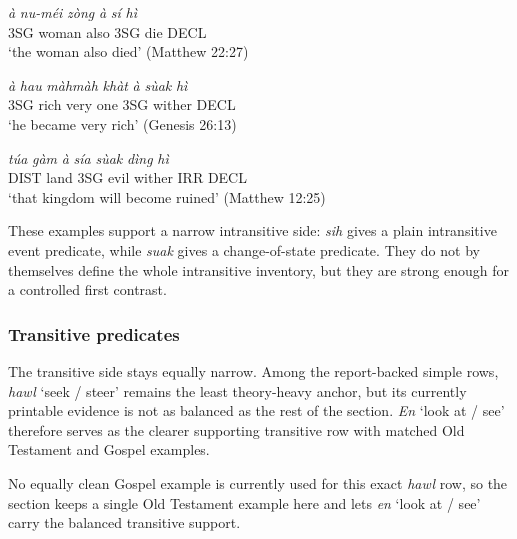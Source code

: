 \documentclass[
  11pt,
  a4paper,
]{article}
\newcommand{\tdim}[1]{\textit{#1}}
\newcommand{\tdimword}[1]{\textit{#1}}
\renewcommand{\textsc}[1]{{\footnotesize\MakeUppercase{#1}}}
\newcommand{\glossquote}[1]{`#1'}
\begin{document}
\begin{exe}
\ex \label{ex:trans-sih-matt22}
\gll \tdimword{à} \tdimword{nu-méi} \tdimword{zòng} \tdimword{à} \tdimword{sí} \tdimword{hì} \\
     \textsc{3sg} woman also \textsc{3sg} die \textsc{decl} \\
\glt \glossquote{the woman also died} (Matthew 22:27)
\end{exe}

\begin{exe}
\ex \label{ex:trans-suak-gen26}
\gll \tdimword{à} \tdimword{hau} \tdimword{màhmàh} \tdimword{khàt} \tdimword{à} \tdimword{sùak} \tdimword{hì} \\
     \textsc{3sg} rich very one \textsc{3sg} wither \textsc{decl} \\
\glt \glossquote{he became very rich} (Genesis 26:13)
\end{exe}

\begin{exe}
\ex \label{ex:trans-suak-matt12}
\gll \tdimword{túa} \tdimword{gàm} \tdimword{à} \tdimword{sía} \tdimword{sùak} \tdimword{dìng} \tdimword{hì} \\
     \textsc{dist} land \textsc{3sg} evil wither \textsc{irr} \textsc{decl} \\
\glt \glossquote{that kingdom will become ruined} (Matthew 12:25)
\end{exe}

These examples support a narrow intransitive side: \tdim{sih} gives a
plain intransitive event predicate, while \tdim{suak} gives a
change-of-state predicate. They do not by themselves define the whole
intransitive inventory, but they are strong enough for a controlled
first contrast.

\subsubsection{Transitive predicates}\label{transitive-predicates}

The transitive side stays equally narrow. Among the report-backed simple
rows, \tdim{hawl} \glossquote{seek / steer} remains the least
theory-heavy anchor, but its currently printable evidence is not as
balanced as the rest of the section. \tdim{En}
\glossquote{look at / see} therefore serves as the clearer supporting
transitive row with matched Old Testament and Gospel examples.

No equally clean Gospel example is currently used for this exact
\tdim{hawl} row, so the section keeps a single Old Testament example
here and lets \tdim{en} \glossquote{look at / see} carry the balanced
transitive support.
\end{document}
